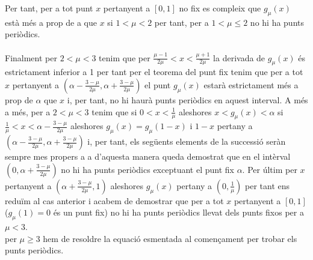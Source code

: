 \documentclass[a4paper,10pt]{article}
\renewcommand{\*}{\cdot}
\renewcommand{\a}{\alpha}
\renewcommand{\u}{\mu}
\begin{document}
Per tant, per a tot punt $x$ pertanyent a $[0,1]$ no fix es compleix que  $g_{\u}(x)$ està més a prop de a que $x$ si $1<\u<2$ per tant, per a $1<\u\le2$ no hi ha punts
periòdics.\\
\phantom{.}\\
Finalment per $2<\u<3$ tenim que per $\frac{\u-1}{2\u}<x<\frac{\u+1}{2\u}$ la derivada de $g_{\u}(x)$ és estrictament inferior a 1 per tant per el teorema del punt fix 
tenim que per a tot $x$ pertanyent a  $\left(\a-\frac{3-\u}{2\u},\a+\frac{3-\u}{2\u}\right)$ el punt $g_{\u}(x)$ estarà estrictament més a prop de $\a$
que $x$ i, per tant, no hi haurà punts periòdics en aquest interval.
A més a més, per a $2<\u<3$ tenim que si $0<x<\frac{1}{\u}$ aleshores $x<g_{\u}(x)<\a$ si $\frac{1}{\u}<x<\a-\frac{3-\u}{2\u}$ aleshores $g_{\u}(x)=g_{\u}(1-x)$ i
$1-x$ pertany a $\left(\a-\frac{3-\u}{2\u},\a+\frac{3-\u}{2\u}\right)$ i, per tant, els següents elements de la successió seràn sempre mes propers a a d'aquesta manera
queda demostrat que en el intèrval $\left(0, \a+\frac{3-\u}{2\u}\right)$ no hi ha punts periòdics exceptuant el punt fix $\a$.
Per últim per $x$ pertanyent a $\left(\a+\frac{3-\u}{2\u}, 1\right)$ aleshores $g_{\u}(x)$ pertany a $\left(0,\frac{1}{\u}\right)$ per tant ens reduïm al cas anterior i
acabem de demostrar que per a tot $x$ pertanyent a $[0,1]$ ($g_{\u}(1)=0$ és un punt fix) no hi ha punts periòdics llevat dels punts fixos per
a $\u<3$.\\
per $\u\ge3$ hem de resoldre la equació esmentada al començament per trobar els punts periòdics.
\end{document}
